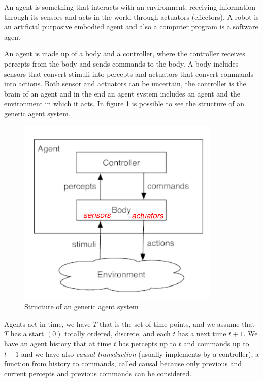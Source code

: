 \begin{defi}
An agent is something that interacts with an environment, receiving information through its sensors and
acts in the world through actuators (effectors).\newline
A robot is an artificial purposive embodied agent and also a computer program is a software agent
\end{defi}
An agent is made up of a body and a controller, where the controller receives percepts from the body and
sends commands to the body.\newline
A body includes sensors that convert stimuli into percepts and actuators that convert commands into actions.
Both sensor and actuators can be uncertain, the controller is the brain of an agent and in the end
an agent system includes an agent and the environment in which it acts.\newline
In figure \ref{img:agentSystem} is possible to see the structure of an generic agent system.

\begin{figure}
    \caption{Structure of an generic agent system}
    \label{img:agentSystem}
    \includegraphics[width=\textwidth]{Images/agent}
\end{figure}

Agents act in time, we have $T$ that is the set of time points, and we assume that $T$ has a start $(0)$
totally ordered, discrete, and each $t$ has a next time $t + 1$.\newline
We have an agent history that at time $t$ has percepts up to $t$ and commands up to $t - 1$ and we 
have also \emph{causal transduction} (usually implements by a controller), a function from history to commands,
called causal because only previous and current percepts and previous commands can be considered.

